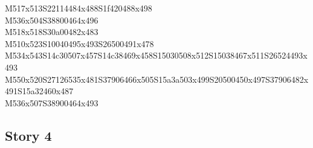\documentclass{article}
\begin{document}
\begin{multicols}{5}
\begin{center}
M517x513S22114484x488S1f420488x498 %
\\M536x504S38800464x496 %
\\M518x518S30a00482x483 %
\\M510x523S10040495x493S26500491x478 %
\\M534x543S14c30507x457S14c38469x458S15030508x512S15038467x511S26524493x493 %
\\M550x520S27126535x481S37906466x505S15a3a503x499S20500450x497S37906482x491S15a32460x487 %
\\M536x507S38900464x493 %
\vfil

\end{center}
\end{multicols}

\subsection{Story 4}
\end{document}
